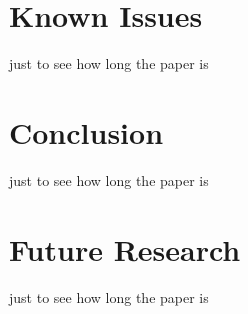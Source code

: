 \section{Known Issues}
just to see how long the paper is

\section{Conclusion}
just to see how long the paper is

\section{Future Research}
just to see how long the paper is